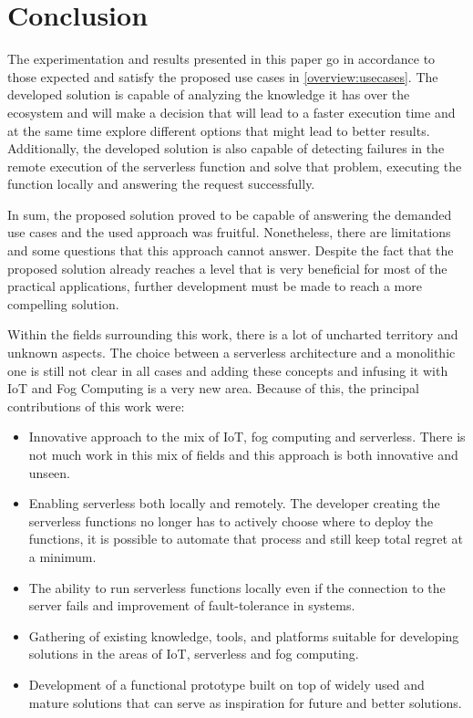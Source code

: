 \section{Conclusion}
The experimentation and results presented in this paper go in accordance to
those expected and satisfy the proposed use cases in \ref{overview:usecases}. The
developed solution is capable of analyzing the knowledge it has over the ecosystem
and will make a decision that will lead to a faster execution time and at the
same time explore different options that might lead to better results.
Additionally, the developed solution is also capable of detecting failures in the
remote execution of the serverless function and solve that problem, executing the
function locally and answering the request successfully.

In sum, the proposed solution proved to be capable of answering the demanded use
cases and the used approach was fruitful. Nonetheless, there are limitations and
some questions that this approach cannot answer.
Despite the fact that the proposed solution already reaches a level that is very
beneficial for most of the practical applications, further development must be
made to reach a more compelling solution.

Within the fields surrounding this work, there is a lot of uncharted
territory and unknown aspects. The choice between a serverless architecture and a
monolithic one is still not clear in all cases and adding these concepts and
infusing it with IoT and Fog Computing is a very new area. Because of this, the
principal contributions of this work were:

\begin{itemize}
    \item Innovative approach to the mix of IoT, fog computing and serverless. There is not much work in this mix of fields and this approach is both innovative
        and unseen.

    \item Enabling serverless both locally and remotely. The developer creating the serverless functions no longer has to actively choose where to deploy the functions, it is possible to automate that process and still keep total
        regret at a minimum.

    \item The ability to run serverless functions locally even if the connection to the server fails and improvement of fault-tolerance in systems.

    \item Gathering of existing knowledge, tools, and platforms suitable for developing solutions in the areas of IoT, serverless and fog computing.

    \item Development of a functional prototype built on top of widely used and mature solutions that can serve as inspiration for future and better solutions.
\end{itemize}

